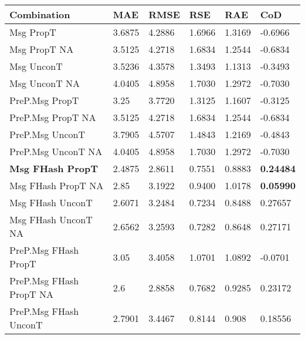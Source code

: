 \begin{table}[htb]
    \begin{tabularx}{\textwidth}{|Y|L{0.091\textwidth}|L{0.096\textwidth}|L{0.077\textwidth}|L{0.077\textwidth}|L{0.105\textwidth}|}
        \hline
        \textbf{Combination} &
        \textbf{MAE} &
        \textbf{RMSE} &
        \textbf{RSE} &
        \textbf{RAE} &
        \textbf{CoD} \\ \hline
        Msg PropT           				& 3.6875				& 4.2886					& 1.6966					& 1.3169					& -0.6966		\\
        Msg PropT NA	     				& 3.5125				& 4.2718					& 1.6834					& 1.2544					& -0.6834		\\
        \hline
        Msg UnconT             				& 3.5236				& 4.3578					& 1.3493					& 1.1313					& -0.3493		\\
        Msg UnconT NA         				& 4.0405				& 4.8958					& 1.7030					& 1.2972					& -0.7030		\\
        \hline
        PreP.Msg PropT     					& 3.25  				& 3.7720					& 1.3125					& 1.1607					& -0.3125		\\
        PreP.Msg PropT NA            		& 3.5125				& 4.2718					& 1.6834					& 1.2544					& -0.6834		\\
        \hline
        PreP.Msg UnconT       				& 3.7905				& 4.5707					& 1.4843					& 1.2169					& -0.4843		\\
        PreP.Msg UnconT NA           		& 4.0405				& 4.8958					& 1.7030					& 1.2972					& -0.7030		\\
        \hline
        \textbf{Msg FHash PropT }   		& 2.4875				& 2.8611					& 0.7551					& 0.8883					& \textbf{0.24484}		\\
        Msg FHash PropT NA  				& 2.85  				& 3.1922					& 0.9400					& 1.0178					& \textbf{0.05990}		\\
        \hline
        Msg FHash UnconT        			& 2.6071				& 3.2484					& 0.7234					& 0.8488					& 0.27657		\\
        Msg FHash UnconT NA        			& 2.6562				& 3.2593					& 0.7282					& 0.8648					& 0.27171		\\
        \hline
        PreP.Msg FHash PropT	   			& 3.05  				& 3.4058					& 1.0701					& 1.0892					& -0.0701		\\
        PreP.Msg FHash PropT NA  			& 2.6   	 			& 2.8858					& 0.7682					& 0.9285					& 0.23172		\\
        \hline
        PreP.Msg FHash UnconT	       		& 2.7901				& 3.4467					& 0.8144					& 0.908						& 0.18556  		\\

\end{tabularx}
\end{table}
